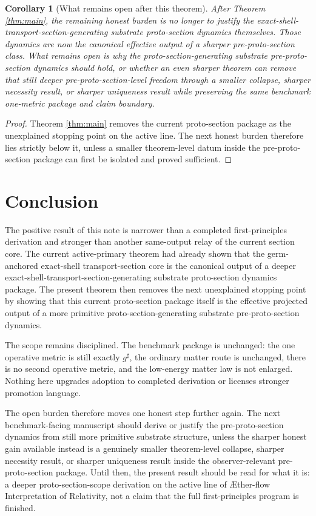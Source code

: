 \documentclass[11pt]{article}
\newcommand{\Aflow}{\AE{}ther-flow}
\newcommand{\TheoryName}{\Aflow{} Interpretation of Relativity}
\newcommand{\CompletedMetric}{g^{\sharp}}
\newtheorem{corollary}{Corollary}
\begin{document}
\begin{corollary}[What remains open after this theorem]
\label{cor:next}
After Theorem \ref{thm:main}, the remaining honest burden is no longer to justify the exact-shell-transport-section-generating substrate proto-section dynamics themselves. Those dynamics are now the canonical effective output of a sharper pre-proto-section class. What remains open is why the proto-section-generating substrate pre-proto-section dynamics should hold, or whether an even sharper theorem can remove that still deeper pre-proto-section-level freedom through a smaller collapse, sharper necessity result, or sharper uniqueness result while preserving the same benchmark one-metric package and claim boundary.
\end{corollary}

\begin{proof}
Theorem \ref{thm:main} removes the current proto-section package as the unexplained stopping point on the active line. The next honest burden therefore lies strictly below it, unless a smaller theorem-level datum inside the pre-proto-section package can first be isolated and proved sufficient.
\end{proof}

\section{Conclusion}

The positive result of this note is narrower than a completed first-principles derivation and stronger than another same-output relay of the current section core. The current active-primary theorem had already shown that the germ-anchored exact-shell transport-section core is the canonical output of a deeper exact-shell-transport-section-generating substrate proto-section dynamics package. The present theorem then removes the next unexplained stopping point by showing that this current proto-section package itself is the effective projected output of a more primitive proto-section-generating substrate pre-proto-section dynamics.

The scope remains disciplined. The benchmark package is unchanged: the one operative metric is still exactly \(\CompletedMetric\), the ordinary matter route is unchanged, there is no second operative metric, and the low-energy matter law is not enlarged. Nothing here upgrades adoption to completed derivation or licenses stronger promotion language.

The open burden therefore moves one honest step further again. The next benchmark-facing manuscript should derive or justify the pre-proto-section dynamics from still more primitive substrate structure, unless the sharper honest gain available instead is a genuinely smaller theorem-level collapse, sharper necessity result, or sharper uniqueness result inside the observer-relevant pre-proto-section package. Until then, the present result should be read for what it is: a deeper proto-section-scope derivation on the active line of \TheoryName{}, not a claim that the full first-principles program is finished.
\end{document}
